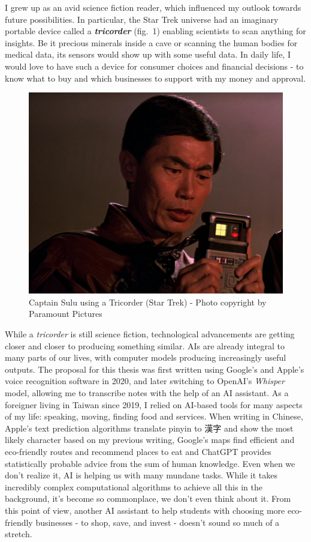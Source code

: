 \documentclass[
  letterpaper,
  DIV=11,
  numbers=noendperiod]{scrartcl}
\begin{document}
I grew up as an avid science fiction reader, which influenced my outlook
towards future possibilities. In particular, the Star Trek universe had
an imaginary portable device called a \textbf{\emph{tricorder}} (fig.~1)
enabling scientists to scan anything for insights. Be it precious
minerals inside a cave or scanning the human bodies for medical data,
its sensors would show up with some useful data. In daily life, I would
love to have such a device for consumer choices and financial decisions
- to know what to buy and which businesses to support with my money and
approval.

\begin{figure}[H]

{\centering \includegraphics[width=0.5\linewidth,height=\textheight,keepaspectratio]{./images/introduction/tricorder.jpg}

}

\caption{Captain Sulu using a Tricorder (Star Trek) - Photo copyright by
Paramount Pictures}

\end{figure}%

While a \emph{tricorder} is still science fiction, technological
advancements are getting closer and closer to producing something
similar. AIs are already integral to many parts of our lives, with
computer models producing increasingly useful outputs. The proposal for
this thesis was first written using Google's and Apple's voice
recognition software in 2020, and later switching to OpenAI's
\emph{Whisper} model, allowing me to transcribe notes with the help of
an AI assistant. As a foreigner living in Taiwan since 2019, I relied on
AI-based tools for many aspects of my life: speaking, moving, finding
food and services. When writing in Chinese, Apple's text prediction
algorithms translate pinyin to 漢字 and show the most likely character
based on my previous writing, Google's maps find efficient and
eco-friendly routes and recommend places to eat and ChatGPT provides
statistically probable advice from the sum of human knowledge. Even when
we don't realize it, AI is helping us with many mundane tasks. While it
takes incredibly complex computational algorithms to achieve all this in
the background, it's become so commonplace, we don't even think about
it. From this point of view, another AI assistant to help students with
choosing more eco-friendly businesses - to shop, save, and invest -
doesn't sound so much of a stretch.
\end{document}
